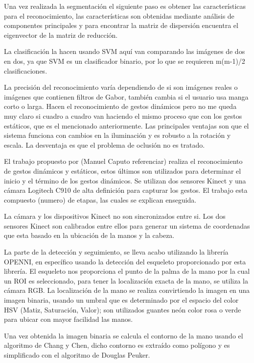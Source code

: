 Una vez realizada la segmentación el siguiente paso es obtener las características para el reconocimiento, las características son obtenidas mediante análisis de componentes principales y para encontrar la matriz de dispersión encuentra el eigenvector de la matriz de reducción. 

La clasificación la hacen usando SVM aquí van comparando las imágenes de dos en dos, ya que SVM es un clasificador binario, por lo que se requieren m(m-1)/2 clasificaciones.   

La precisión del reconocimiento varía dependiendo de si son imágenes reales o imágenes que contienen filtros de Gabor, también cambia si el usuario usa manga corto o larga. Hacen el reconocimiento de gestos dinámicos pero no me queda muy claro si cuadro a cuadro van haciendo el mismo proceso que con los gestos estáticos, que es el mencionado anteriormente. 
Las principales ventajas son que el sistema funciona con cambios en la iluminación y es robusto a la rotación y escala. La desventaja es que el problema de oclusi\'on no es tratado. 


El trabajo propuesto por (Manuel Caputo referenciar) realiza el reconocimiento de gestos dinámicos y estáticos, estos últimos son utilizados para determinar el inicio y el término de los gestos dinámicos.  Se utilizan  dos sensores Kinect y una cámara Logitech C910 de alta definición para capturar los gestos. El trabajo esta compuesto (numero) de etapas, las cuales se explican enseguida. 

La cámara y los dispositivos Kinect no son sincronizados entre si. Los dos sensores Kinect son calibrados entre ellos para generar un sistema de coordenadas que esta basado en la ubicación de la  manos y la cabeza. 

La parte de la detección y seguimiento, se lleva acabo utilizando la librería OPENNI, en específico usando la detección del esqueleto proporcionado por esta librería. El esqueleto nos proporciona el punto de la palma de la mano por la cual un ROI es seleccionado, para tener la localización exacta de la mano, se utiliza la cámara RGB. La localización de la mano se realiza convirtiendo la imagen en una imagen binaria, usando un umbral que es determinado por el espacio del color HSV (Matiz, Saturación, Valor); son utilizados guantes neón color rosa o verde para ubicar con mayor facilidad las manos.   

Una vez obtenida la imagen binaria se calcula el contorno de la mano usando el algoritmo de Chang y Chen, dicho contorno es extraído como polígono y  es simplificado con el algoritmo de Douglas Peuker. 

